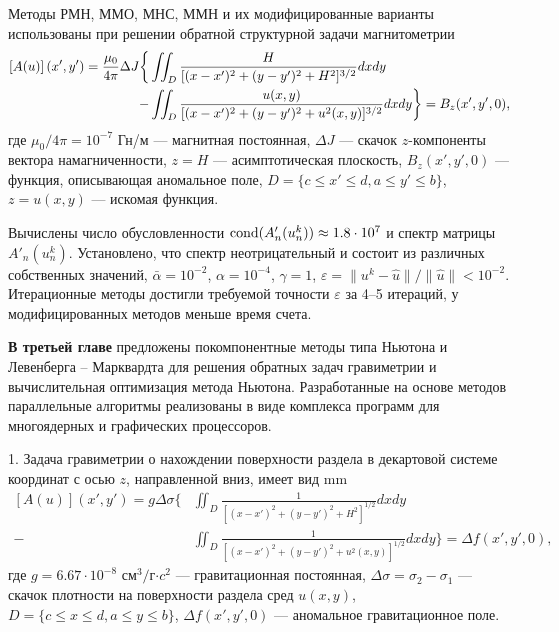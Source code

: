 \documentclass[%
autoref,     %
href,        %
colorlinks,  %
]{disser}
\begin{document}
Методы РМН, ММО, МНС, ММН и их модифицированные варианты использованы при решении обратной структурной задачи магнитометрии
\begin{equation*}\begin{aligned}
\left[A(u)\right](x',y')=\frac{\mu_0}{4\pi}\Delta J  \bigg\{&\iint_{D} \frac{H}{[(x-x')^2+(y-y')^2+H^2]^{3/2}}dxdy \notag\\
- &\iint_{D} \frac{u(x,y)}{[(x-x')^2+(y-y')^2+u^2(x,y)]^{3/2}}dxdy \bigg\}= B_z(x',y',0),
\end{aligned} \end{equation*}
где $\mu_0/{4\pi}=10^{-7}$ Гн/м --- магнитная постоянная, $\Delta J$ --- скачок $z$-компоненты вектора намагниченности, $z=H$ --- асимптотическая плоскость, $ B_z(x',y',0)$ --- функция, описывающая  аномальное поле, $D=\{c\leqslant x' \leqslant d, a\leqslant y' \leqslant b\}$, $z=u(x,y)$ --- искомая функция.

Вычислены число обусловленности $\textnormal{cond}(A'_n(u_n^k))\approx 1.8\cdot 10^7$ и спектр матрицы $A'_n(u_n^k)$. Установлено, что спектр неотрицательный и состоит из различных собственных значений, $\bar\alpha=10^{-2}$, $\alpha = 10^{-4}$, $\gamma=1$, $\varepsilon =\|u^k-\hat{u}\|/\|\hat{u}\| < 10^{-2}$. Итерационные методы достигли требуемой точности $\varepsilon$ за 4--5 итераций, у модифицированных методов меньше время счета.

\textbf{В третьей главе} предложены покомпонентные методы типа Ньютона и Левенберга -- Марквардта для решения обратных задач гравиметрии и вычислительная оптимизация метода Ньютона. Разработанные на основе методов параллельные алгоритмы реализованы в виде комплекса программ для многоядерных и графических процессоров.

1. Задача гравиметрии о нахождении поверхности раздела в декартовой системе координат с осью $z$, направленной вниз, имеет вид
 mm
\begin{equation}\label{equ_grav_2l}
\begin{aligned}
\left[A(u)\right](x',y')=g\Delta\sigma \bigg\{ &\iint_{D} \frac{1}{[(x-x')^2+(y-y')^2+H^2]^{1/2}}dxdy \\
- &\iint_{D} \frac{1}{[(x-x')^2+(y-y')^2+u^2(x,y)]^{1/2}}dxdy\bigg\}=\Delta f(x',y',0),
\end{aligned} 
\end{equation}
	где $g=6.67\cdot10^{-8}$ см$^3/$г$\cdot c^2$ --- гравитационная постоянная, $\Delta\sigma=\sigma_2-\sigma_1$ --- скачок плотности на поверхности раздела сред $u(x,y)$, $D=\{c\leqslant x \leqslant d, a\leqslant y \leqslant b\}$, $\Delta f(x',y',0)$ --- аномальное гравитационное поле.%
	
\end{document}
